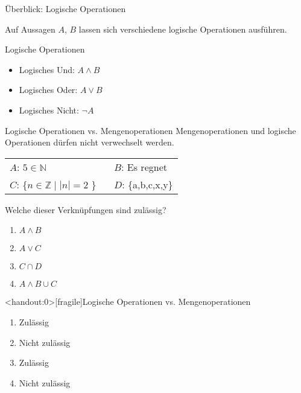 \begin{frame}{Überblick: Logische Operationen}

	Auf \alert{Aussagen} $A$, $B$ lassen sich verschiedene logische Operationen ausführen.

	\begin{exampleblock}{Logische Operationen}
		\begin{itemize}
			\item Logisches Und: $A \wedge B$
			\item Logisches Oder: $A \vee B$
			\item Logisches Nicht: $\neg A$
		\end{itemize}
	\end{exampleblock}
\end{frame}

{
\begin{frame}{Logische Operationen vs. Mengenoperationen}
	\alert{Mengenoperationen und logische Operationen dürfen nicht verwechselt werden.}
	\begin{table}[]
		\begin{tabular}{l l}
			$A$: $5 \in \mathbb{N}$                    & $B$: Es regnet     \\
			$C$: \{$n \in \mathbb{Z} \mid |n|=2$ \} \  & $D$: \{a,b,c,x,y\} \\
		\end{tabular}
	\end{table}
	\begin{block}{Welche dieser Verknüpfungen sind zulässig?}
		\begin{enumerate}
			\item $A \wedge B$
			\item $A \vee C$
			\item $C \cap D$
			\item $A \wedge B \cup C$
		\end{enumerate}
	\end{block}
\end{frame}
}

{
\begin{frame}<handout:0>[fragile]{Logische Operationen vs. Mengenoperationen}
	\begin{enumerate}[<+- | alert@+>]
		\item Zulässig
		\item Nicht zulässig
		\item Zulässig
		\item Nicht zulässig
	\end{enumerate}
\end{frame}
}



